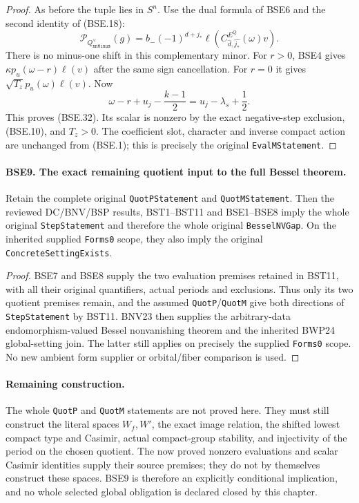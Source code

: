 \begin{proof}
As before the tuple lies in $S^n$.
Use the dual formula of BSE6 and the second identity of (BSE.18):
\[
 \mathcal P_{Q^\vee_{\texttt{nnMinus}}}(g)
       =b_-(-1)^{d+j_*}
               \ell\!\left(C^{E^Q}_{\widehat d,\widehat{j_*}}
                                                   (\omega)v\right).
 \tag{BSE.33}
\]
There is no minus-one shift in this complementary minor.
For $r>0$, BSE4 gives
$\kappa p_u(\omega-r)\ell(v)$ after the same sign cancellation.
For $r=0$ it gives
$\sqrt{T_z}p_u(\omega)\ell(v)$.
Now
\[
 \omega-r+u_j-\frac{k-1}{2}
                                  =u_j-\lambda_s+\frac12.
 \tag{BSE.34}
\]
This proves (BSE.32).  Its scalar is nonzero by the exact
negative-step exclusion, (BSE.10), and $T_z>0$.
The coefficient slot, character and inverse compact action are
unchanged from (BSE.1); this is precisely the original
\texttt{EvalMStatement}.
\end{proof}

\paragraph{BSE9. The exact remaining quotient input to the full Bessel theorem.}
\label{claim:BSE9}
Retain the complete original \texttt{QuotPStatement} and
\texttt{QuotMStatement}.  Then the reviewed DC/BNV/BSP results,
BST1--BST11 and BSE1--BSE8 imply the whole original
\texttt{StepStatement} and therefore the whole original
\texttt{BesselNVGap}.
On the inherited supplied \texttt{Forms0} scope, they also imply
the original \texttt{ConcreteSettingExists}.

\begin{proof}
BSE7 and BSE8 supply the two evaluation premises retained in BST11,
with all their original quantifiers, actual periods and exclusions.
Thus only its two quotient premises remain, and the assumed
\texttt{QuotP}/\texttt{QuotM} give both directions of
\texttt{StepStatement} by BST11.
BNV23 then supplies the arbitrary-data endomorphism-valued Bessel
nonvanishing theorem and the inherited BWP24 global-setting join.
The latter still applies on precisely the supplied
\texttt{Forms0} scope.
No new ambient form supplier or orbital/fiber comparison is used.
\end{proof}

\paragraph{Remaining construction.}
The whole \texttt{QuotP} and \texttt{QuotM} statements are not
proved here.  They must still construct the literal spaces
$W_f,W'$, the exact image relation, the shifted lowest compact type
and Casimir, actual compact-group stability, and injectivity of
the period on the chosen quotient.
The now proved nonzero evaluations and scalar Casimir identities
supply their source premises; they do not by themselves construct
these spaces.  BSE9 is therefore an explicitly conditional
implication, and no whole selected global obligation is declared
closed by this chapter.
